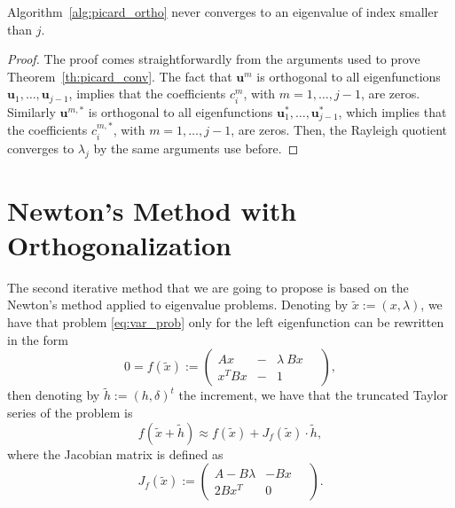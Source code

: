 \documentclass[smallextended]{svjour3}
\begin{document}
\begin{theorem}
Algorithm~\ref{alg:picard_ortho} never converges to an eigenvalue of index smaller than $j$.
\end{theorem}

\begin{proof}
The proof comes straightforwardly from the arguments used to prove Theorem~\ref{th:picard_conv}.
The fact that $\mathbf{u}^m$ is orthogonal to all eigenfunctions $\mathbf{u}_1,\dots,\mathbf{u}_{j-1}$, implies that the coefficients $c_i^m$, with $m=1,\dots,j-1$, are zeros. Similarly $\mathbf{u}^{m,*}$ is orthogonal to all eigenfunctions $\mathbf{u}_1^*,\dots,\mathbf{u}_{j-1}^*$, which implies that the coefficients $c_i^{m,*}$, with $m=1,\dots,j-1$, are zeros.
Then, the Rayleigh quotient converges to $\lambda_j$ by the same arguments use before.
\end{proof}




\section{Newton's Method with Orthogonalization}\label{sec:newton}


The second iterative method that we are going to propose is based on the Newton's method applied to eigenvalue problems. Denoting by $\tilde x:=(x,\lambda)$, we have that problem \eqref{eq:var_prob} only for the left eigenfunction can be rewritten in the form
$$
0=f(\tilde x):=
\left(
\begin{array}{lcl}
A x&-& \lambda\ Bx
\\
  x^T Bx&-& 1
\end{array}\quad
\right) ,
$$
then denoting by $\tilde h:=(h, \delta)^t$ the increment, we have that the truncated Taylor series of the problem is
\begin{equation}\label{eq:newton}
f(\tilde x + \tilde h)\approx f(\tilde x) + J_f(\tilde x)\cdot \tilde h, 
\end{equation}
where the Jacobian matrix is defined as
$$
J_f(\tilde x):=
\left(
\begin{array}{lr}
A - B\lambda & -Bx
\\
  2Bx^T  & 0
\end{array}\quad
\right) .
$$
\end{document}
